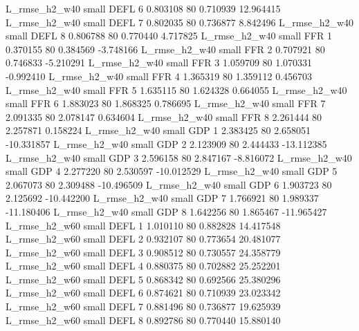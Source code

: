  L_rmse_h2_w40      small     DEFL                 6 0.803108 80       0.710939          12.964415
 L_rmse_h2_w40      small     DEFL                 7 0.802035 80       0.736877           8.842496
 L_rmse_h2_w40      small     DEFL                 8 0.806788 80       0.770440           4.717825
 L_rmse_h2_w40      small      FFR                 1 0.370155 80       0.384569          -3.748166
 L_rmse_h2_w40      small      FFR                 2 0.707921 80       0.746833          -5.210291
 L_rmse_h2_w40      small      FFR                 3 1.059709 80       1.070331          -0.992410
 L_rmse_h2_w40      small      FFR                 4 1.365319 80       1.359112           0.456703
 L_rmse_h2_w40      small      FFR                 5 1.635115 80       1.624328           0.664055
 L_rmse_h2_w40      small      FFR                 6 1.883023 80       1.868325           0.786695
 L_rmse_h2_w40      small      FFR                 7 2.091335 80       2.078147           0.634604
 L_rmse_h2_w40      small      FFR                 8 2.261444 80       2.257871           0.158224
 L_rmse_h2_w40      small      GDP                 1 2.383425 80       2.658051         -10.331857
 L_rmse_h2_w40      small      GDP                 2 2.123909 80       2.444433         -13.112385
 L_rmse_h2_w40      small      GDP                 3 2.596158 80       2.847167          -8.816072
 L_rmse_h2_w40      small      GDP                 4 2.277220 80       2.530597         -10.012529
 L_rmse_h2_w40      small      GDP                 5 2.067073 80       2.309488         -10.496509
 L_rmse_h2_w40      small      GDP                 6 1.903723 80       2.125692         -10.442200
 L_rmse_h2_w40      small      GDP                 7 1.766921 80       1.989337         -11.180406
 L_rmse_h2_w40      small      GDP                 8 1.642256 80       1.865467         -11.965427
 L_rmse_h2_w60      small     DEFL                 1 1.010110 80       0.882828          14.417548
 L_rmse_h2_w60      small     DEFL                 2 0.932107 80       0.773654          20.481077
 L_rmse_h2_w60      small     DEFL                 3 0.908512 80       0.730557          24.358779
 L_rmse_h2_w60      small     DEFL                 4 0.880375 80       0.702882          25.252201
 L_rmse_h2_w60      small     DEFL                 5 0.868342 80       0.692566          25.380296
 L_rmse_h2_w60      small     DEFL                 6 0.874621 80       0.710939          23.023342
 L_rmse_h2_w60      small     DEFL                 7 0.881496 80       0.736877          19.625939
 L_rmse_h2_w60      small     DEFL                 8 0.892786 80       0.770440          15.880140
